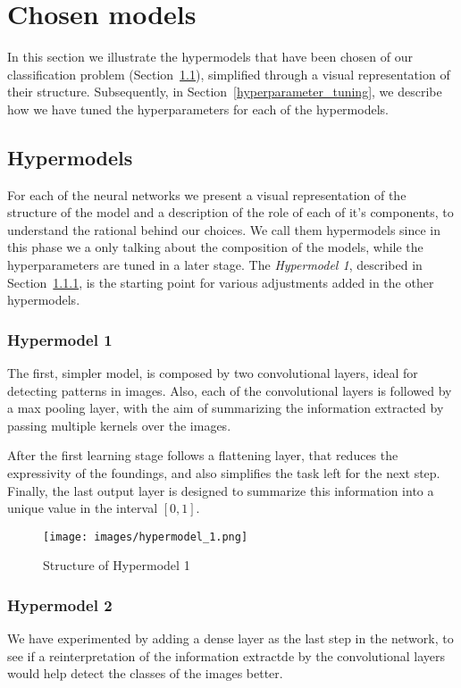 \section{Chosen models}\label{2_models}
In this section we illustrate the hypermodels that have been chosen of our classification problem (Section~\ref{hypermodels}), simplified through a visual representation of their structure. Subsequently, in Section~\ref{hyperparameter_tuning}, we describe how we have tuned the hyperparameters for each of the hypermodels.

\subsection{Hypermodels}\label{hypermodels}
For each of the neural networks we present a visual representation of the structure of the model and a description of the role of each of it's components, to understand the rational behind our choices. We call them hypermodels since in this phase we a only talking about the composition of the models, while the hyperparameters are tuned in a later stage. The \textsl{Hypermodel 1}, described in Section~\ref{hypermodel_1}, is the starting point for various adjustments added in the other hypermodels.

\subsubsection{Hypermodel 1}\label{hypermodel_1}
The first, simpler model, is composed by two convolutional layers, ideal for detecting patterns in images. Also, each of the convolutional layers is followed by a max pooling layer, with the aim of summarizing the information extracted by passing multiple kernels over the images.

After the first learning stage follows a flattening layer, that reduces the expressivity of the foundings, and also simplifies the task left for the next step. Finally, the last output layer is designed to summarize this information into a unique value in the interval $\left[0,1\right]$.

\begin{figure}[h]
    \label{fig:Hypermodel_1}
    \centering
    \texttt{[image: images/hypermodel\_1.png]}
    \caption{Structure of Hypermodel 1}
\end{figure}

\subsubsection{Hypermodel 2}\label{hypermodel_2}
We have experimented by adding a dense layer as the last step in the network, to see if a reinterpretation of the information extractde by the convolutional layers would help detect the classes of the images better.

